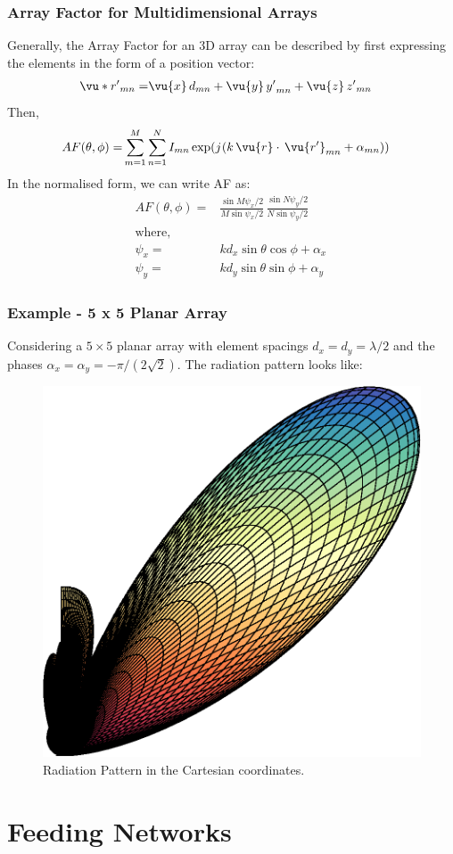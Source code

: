 \documentclass[10pt]{beamer}
\renewcommand{\j}{{j}\mkern1mu} %
\begin{document}
\begin{frame}
    \frametitle{Array Factor for Multidimensional Arrays}
    Generally, the Array Factor for an 3D array can be described by first expressing the elements in the form of a position vector:
    \small
    \begin{align*}
        \vu*{r'}_{mn} {}=& \vu{x} \, {d}_{mn} + \vu{y} \, {y'}_{mn} + \vu{z} \, {z'}_{mn}
    \end{align*}
    Then,
    \begin{align*}
        AF (\theta, \phi ) {}=& \sum_{m = 1}^{M} \sum_{n = 1}^{N} I_{mn} \exp(\j (k \, \vu{r}\cdot \, \vu{r'}_{mn} + \alpha_{mn}))
    \end{align*}
    In the normalised form, we can write AF as:
    \begin{align*}
        AF (\theta, \phi) {}=&  \frac{\sin M \psi_x/2 }{{M \sin \psi_x/2}} \, \frac{\sin N \psi_y/2 }{{N \sin \psi_y/2}} \\
        \text{where,} \\
        \psi_x  {}=& k d_x \sin \theta \cos \phi + \alpha_x \, \\
        \psi_y  {}=& k d_y \sin \theta \sin \phi + \alpha_y
    \end{align*}
\end{frame}

\begin{frame}
    \frametitle{Example - 5 x 5 Planar Array}

    Considering a $5 \times 5$ planar array with element spacings $d_x = d_y =  \lambda/2$ and the phases $\alpha_x = \alpha_y = -\pi/(2 \sqrt{2})$. The radiation pattern looks like:
    \begin{figure}[htbp]
        \centering
        \includegraphics[width=.35\textwidth]{3d_polar_plot_3.eps}
        \caption{Radiation Pattern in the Cartesian coordinates.}
    \end{figure}
\end{frame}

\section{Feeding Networks}
\end{document}
